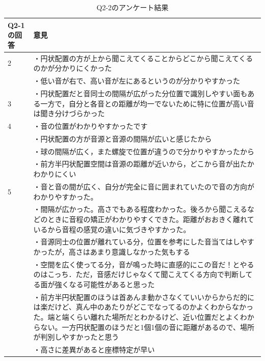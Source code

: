 \begin{table}[H]\centering 
    \caption{Q2-2のアンケート結果}\label{tab:Q2-2}
    \begin{tabular}{lp{15cm}} \hline
    Q2-1の回答 & 意見\\ \hline
    2 & ・円状配置の方が上から聞こえてくることからどこから聞こえてくるのかが分かりにくかった\\[2ex]
     & ・低い音が右で、高い音が左にあるというのが分かりやすかった\\[2ex]
    3 & ・円状配置だと音同士の間隔が広がった分位置で識別しやすい面もある一方で，自分と各音との距離が均一でないために特に位置が高い音は聞き分けづらかった\\[2ex]
    4 & ・音の位置がわかりやすかったです\\
     & ・円状配置の方が音源と音源の間隔が広いと感じたから\\[2ex]
     & ・球の間隔が広く，また螺旋で位置が違うので分かりやすかったから\\[2ex]
     & ・前方半円状配置空間は音源の距離が近いから，どこから音が出たかわかりにくい\\[2ex]
    5 & ・音と音の間が広く、自分が完全に音に囲まれていたので音の方向がわかりやすかった。\\[2ex]
     & ・間隔が広かった。高さでもある程度わかった。後ろから聞こえるなどのときに音程の矯正がわかりやすくできた。距離がおおきく離れているから音程の感覚の違いに気づきやすかった。\\ [2ex]
     & ・音源同士の位置が離れている分，位置を参考にした音当てはしやすかったが，高さはあまり意識しなかった気もする\\ 
     & ・空間を広く使ってる分，音が鳴った時に直感的にこの音だ！とやるのはこっち．ただ，音感だけじゃなくて聞こえてくる方向で判断してる面が強くなる可能性があると思った\\
     & ・前方半円状配置のほうは首あんま動かさなくていいからからだ的には楽だけど、真ん中のあたりがどこでなってるのかよくわからなかった。端と端くらい離れた場所だとわかるけど、近い位置だとよくわからない。一方円状配置のほうだと1個1個の音に距離があるので、場所が判別しやすかったと思う\\[2ex]
     & ・高さに差異があると座標特定が早い\\\hline
    \end{tabular}
\end{table}

